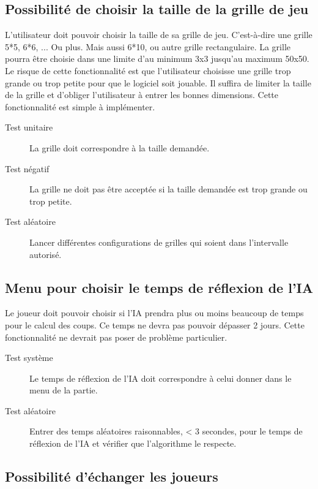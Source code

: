 \documentclass[a4paper,12pt]{article}
\begin{document}
\subsection{Possibilité de choisir la taille de la grille de jeu}

L'utilisateur doit pouvoir choisir la taille de sa grille de jeu. C'est-à-dire une grille 5*5, 6*6, ... Ou plus. Mais aussi 6*10, ou autre grille rectangulaire. La grille pourra être choisie dans une limite d'au minimum 3x3 jusqu'au maximum 50x50. Le risque de cette fonctionnalité est que l'utilisateur choisisse une grille trop grande ou trop petite pour que le logiciel soit jouable. Il suffira de limiter la taille de la grille et d'obliger l'utilisateur à entrer les bonnes dimensions. Cette fonctionnalité est simple à implémenter.

\begin{description}
\item[Test unitaire] La grille doit correspondre à la taille demandée.
\item[Test négatif] La grille ne doit pas être acceptée si la taille demandée est trop grande ou trop petite.
\item[Test aléatoire] Lancer différentes configurations de grilles qui soient dans l’intervalle autorisé.
\end{description}

\subsection{Menu pour choisir le temps de réflexion de l’IA}

Le joueur doit pouvoir choisir si l’IA prendra plus ou moins beaucoup de temps pour le calcul des coups. Ce temps ne devra pas pouvoir dépasser 2 jours. Cette fonctionnalité ne devrait pas poser de problème particulier.

\begin{description}
\item[Test système] Le temps de réflexion de l’IA doit correspondre à celui donner dans le menu de la partie.
\item[Test aléatoire]  Entrer des temps aléatoires raisonnables, < 3 secondes, pour le temps de réflexion de l’IA et vérifier que l’algorithme le respecte.
\end{description}


\subsection{Possibilité d’échanger les joueurs}
\end{document}
